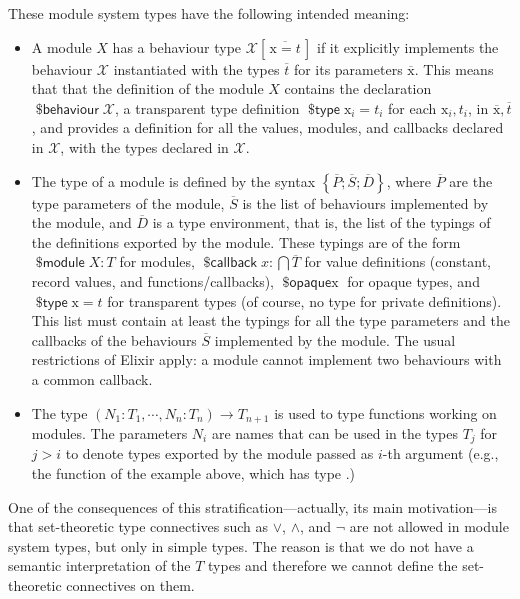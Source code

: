 \documentclass[a4paper,10pt]{article}
\DeclareMathOperator{\kwbvr}{\textsf{\$behaviour}}
\DeclareMathOperator{\kwopq}{\textsf{\$opaque}}
\DeclareMathOperator{\kwtp}{\textsf{\$type}}
\DeclareMathOperator{\kwmdl}{\textsf{\$module}}
\DeclareMathOperator{\kwclbk}{\textsf{\$callback}}
\newcommand{\tx}{\textrm{x}}
\newcommand{\BX}{\ensuremath{\mathcal{X}}}
\begin{document}
  These module system types have the following intended meaning:
  \begin{itemize}
    \item A module $X$ has a behaviour type $\BX[\,\overline{\tx= t}\,]$ if it explicitly implements the behaviour $\BX$ instantiated with the types $\overline{t}$ for its parameters $\overline{\tx}$. This means that that the definition of the module $X$ contains the declaration $\kwbvr \BX$, a transparent type definition $\kwtp \tx_i=t_i$ for each  $\tx_i, t_i$, in $\overline{\tx}, \overline t$, and provides a definition for all the values, modules, and callbacks declared in $\BX$, with the types declared in $\BX$. 
    \item The type of a module is defined by the syntax $\left\{\overline{P};\overline{S};\overline{D}\right\}$, where $\overline{P}$ are the type parameters of the module, $\overline{S}$ is the list of behaviours implemented by the module, and $\overline{D}$ is a type environment, that is, the list of the typings of the definitions exported by the module. These typings are of the form $\kwmdl X : T$ for modules, $\kwclbk x : \bigcap \overline{T}$ for value definitions (constant, record values, and functions/callbacks), $\kwopq \tx$ for opaque types, and $\kwtp \tx = t$ for transparent types (of course, no type for private definitions). This list must contain at least the typings for all the type parameters and the callbacks of the behaviours $\overline{S}$ implemented by the module. The usual restrictions of Elixir apply: a module cannot implement two  behaviours with a common callback. 
    \item The type $(N_1{:} T_1,\cdots, N_n{:}T_n) \to T_{n+1}$ is used to type functions working on modules. The parameters $N_i$ are names that can be used in the types $T_j$ for $j>i$ to denote types exported by the module passed as $i$-th argument (e.g., the  function of the  example above, which has type .)
\end{itemize}

  One of the consequences of this stratification---actually, its main motivation---is that set-theoretic type connectives such as $\vee$, $\wedge$, and $\neg$ are not allowed in module system types, but only in simple types. The reason is that we do not have a semantic interpretation of the $T$ types and therefore we cannot define the set-theoretic connectives on them.
\end{document}
